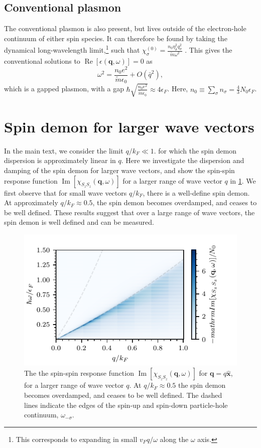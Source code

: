 \documentclass[aps,prb,reprint,twocolumns,superscriptaddress,nofootinbib]{revtex4-2}
\DeclareMathOperator{\Imm}{Im}
\DeclareMathOperator{\Ree}{Re}
\newcommand{\mdos}{\tilde{m}}
\newcommand{\kF}{k_{F}}
\begin{document}
	
	\subsection{Conventional plasmon}
	The conventional plasmon is also present, but lives outside of the electron-hole continuum of either spin species. It can therefore be found by taking the dynamical long-wavelength limit,\footnote{This corresponds to expanding in small $v_Fq/\omega$ along the $\omega$ axis. } such that $\chi_{\sigma}^{(0)}=\frac{n_0 \eta_\sigma^2 q_\sigma^2}{\mdos \omega^2}$ \cite{giulianiQuantumTheoryElectron2005}. This gives the conventional solutions to $\Ree[\epsilon(\bm q,\omega)]=0$ as 
	\begin{equation}
		\omega^2 = \frac{n_0 e^2}{\mdos\epsilon_0} + O(\bar q^2),
	\end{equation}
	which is a gapped plasmon, with a gap $\hbar\sqrt{\frac{n_0 e^2}{\mdos\epsilon_0}}\approx 4\epsilon_F$. Here, $n_0\equiv\sum_\sigma n_\sigma=\frac{4}{3}N_0\epsilon_F$. 
	
	\section{Spin demon for larger wave vectors}
	In the main text, we consider the limit $q/\kF\ll1$. for which the spin demon dispersion is approximately linear in $q$. Here we investigate the dispersion and damping of the spin demon for larger wave vectors, and show the spin-spin response function $\Imm[\chi_{S_zS_z}(\bm q,\omega)]$ for a larger range of wave vector $q$ in \cref{fig:larger-q}. We first observe that for small wave vectors $q/\kF$, there is a well-define spin demon. At approximately $q/\kF\approx 0.5$, the spin demon becomes overdamped, and ceases to be well defined. These results suggest that over a large range of wave vectors, the spin demon is well defined and can be measured.
	
	\begin{figure}
		\includegraphics{SzSz_3D_large_range}
		\caption{The the spin-spin response function $\Imm[\chi_{S_zS_z}(\bm q,\omega)]$ for $\bm q =q\hat{\bm x}$, for a larger range of wave vector $q$. At $q/\kF\approx 0.5$ the spin demon becomes overdamped, and ceases to be well defined. The dashed lines indicate the edges of the spin-up and spin-down particle-hole continuum, $\omega_{-\sigma}$. }
		\label{fig:larger-q}
	\end{figure}
	
\end{document}
